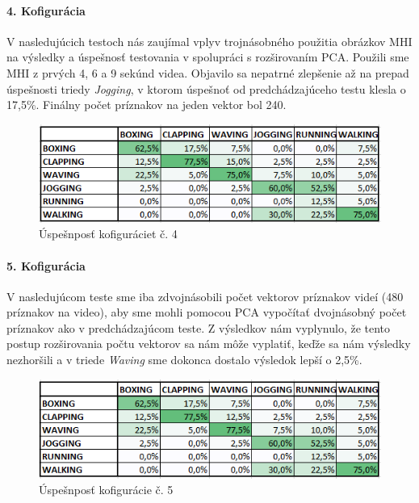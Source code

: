 \paragraph{4. Kofigurácia} 
V nasledujúcich testoch nás zaujímal vplyv trojnásobného použitia obrázkov MHI na výsledky a úspešnosť testovania v spolupráci s rozširovaním PCA. Použili sme MHI z prvých 4, 6 a 9 sekúnd videa. Objavilo sa nepatrné zlepšenie až na prepad úspešnosti triedy \textit{Jogging}, v ktorom úspešnoť od predchádzajúceho testu klesla o 17,5\%. Finálny počet príznakov na jeden vektor bol 240.

\begin{figure}[H]
  \centering
  \includegraphics[width=14cm]{img/test6PCA1g.png}
  \caption{Úspešnposť kofiguráciet č. 4}
  \label{test4}
\end{figure} 

\paragraph{5. Kofigurácia} 
V nasledujúcom teste sme iba zdvojnásobili počet vektorov príznakov videí (480 príznakov na video), aby sme mohli pomocou PCA vypočítať dvojnásobný počet príznakov ako v predchádzajúcom teste. Z výsledkov nám vyplynulo, že tento postup rozširovania počtu vektorov sa nám môže vyplatiť, keďže sa nám výsledky nezhoršili a v triede \textit{Waving} sme dokonca dostalo výsledok lepší o 2,5\%. 
\begin{figure}[H]
  \centering
  \includegraphics[width=14cm]{img/test6PCA2g.png}
  \caption{Úspešnposť kofigurácie č. 5}
  \label{test5}
\end{figure} 

